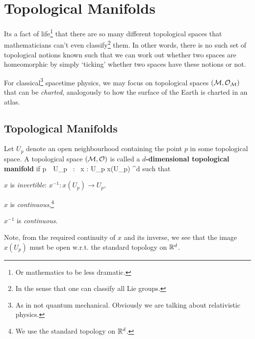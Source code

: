 \chapter{Topological Manifolds}

Its a fact of life\footnote{Or mathematics to be less dramatic.} that there are so many different topological spaces that mathematicians can't even classify\footnote{In the sense that one can classify all Lie groups.} them. In other words, there is no such set of topological notions known such that we can work out whether two spaces are homeomorphic by simply `ticking' whether two spaces have these notions or not. 

For classical\footnote{As in not quantum mechanical. Obviously we are talking about relativistic physics.} spacetime physics, we may focus on topological spaces $(\mathcal{M},\mathcal{O}_{\mathcal{M}})$ that can be \textit{charted}, analogously to how the surface of the Earth is charted in an atlas. 

\section{Topological Manifolds}

\bd 
    Let $U_p$ denote an open neighbourhood containing the point $p$ in some topological space. A topological space $(\mathcal{M},\mathcal{O})$ is called a \textbf{$d$-dimensional topological manifold} if 
    \bse 
        \forall p\in \cM \, \, \exists U_p \in \cO \, : \, \exists x : U_p \to x(U_p) \se \R^d 
    \ese 
    such that 
    \benr 
        \item $x$ is \textit{invertible}: $x^{-1}:x(U_p) \to U_p$,
        \item $x$ is \textit{continuous},\footnote{We use the standard topology on $\mathbb{R}^d$.}
        \item $x^{-1}$ is \textit{continuous}.
    \een 
\ed 

\br 
    Note, from the required continuity of $x$ and its inverse, we see that the image $x(U_p)$ must be open w.r.t. the standard topology on $\mathbb{R}^d$. 
\er 

